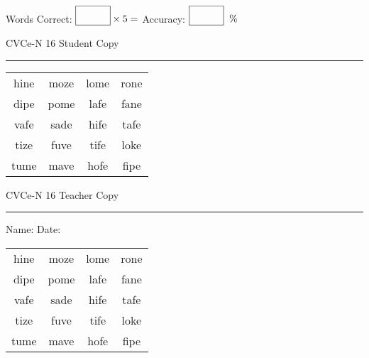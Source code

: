 \documentclass{memoir}
\begin{document}
\small

Words Correct: $\fbox{\phantom{\huge 100}} \times 5 = $ Accuracy: $\fbox{\phantom{\huge 100}}\;\; \%$ 

\vfill

\newpage


\footnotesize \noindent
CVCe-N 16 \hfill Student Copy
\smallskip
\hrule

\Large

\setlength{\tabcolsep}{14pt}
\def\arraystretch{2}

{\selectfont


\begin{vplace}[0.5]
\begin{center}
\begin{tabular}{cccc}
hine & moze & lome & rone \\
dipe & pome & lafe & fane \\
vafe & sade & hife & tafe \\
tize & fuve & tife & loke \\
tume & mave & hofe & fipe \\
\end{tabular}
\end{center}
\end{vplace}

}

\newpage

\footnotesize \noindent
CVCe-N 16 \hfill Teacher Copy
\smallskip
\hrule

\small

\vfill

\noindent
Name: \underline{\hspace{1.75in}} \hfill Date: \underline{\hspace{1in}}

\Large

{\selectfont


\begin{vplace}[0.5]
\begin{center}
\begin{tabular}{cccc}
hine & moze & lome & rone \\
dipe & pome & lafe & fane \\
vafe & sade & hife & tafe \\
tize & fuve & tife & loke \\
tume & mave & hofe & fipe \\
\end{tabular}
\end{center}
\end{vplace}



}
\end{document}
